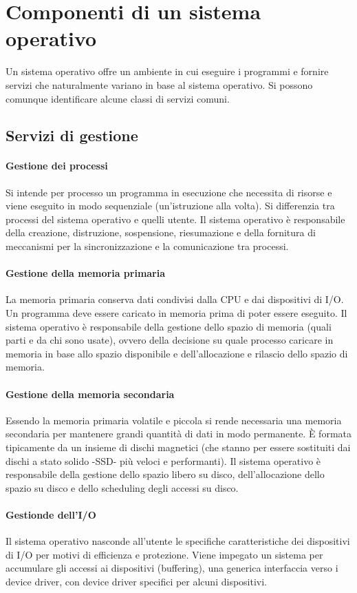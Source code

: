 \chapter{Componenti di un sistema operativo}
Un sistema operativo offre un ambiente in cui eseguire i programmi e fornire servizi che naturalmente variano in base al sistema operativo. Si possono comunque identificare alcune classi di servizi comuni.
\section{Servizi di gestione}
\subsubsection{Gestione dei processi}
Si intende per processo un programma in esecuzione che necessita di risorse e viene eseguito in modo sequenziale (un'istruzione alla volta). Si differenzia tra processi del sistema operativo e quelli utente. Il 
sistema operativo \`e responsabile della creazione, distruzione, sospensione, riesumazione e della fornitura di meccanismi per la sincronizzazione e la comunicazione tra processi.
\subsubsection{Gestione della memoria primaria}
La memoria primaria conserva dati condivisi dalla CPU e dai dispositivi di I/O. Un programma deve essere caricato in memoria prima di poter essere eseguito. Il sistema operativo \`e responsabile della gestione 
dello spazio di memoria (quali parti e da chi sono usate), ovvero della decisione su quale processo caricare in memoria in base allo spazio disponibile e dell'allocazione e rilascio dello spazio di memoria. 
\subsubsection{Gestione della memoria secondaria}
Essendo la memoria primaria volatile e piccola si rende necessaria una memoria secondaria per mantenere grandi quantit\`a di dati in modo permanente. \`E formata tipicamente da un insieme di dischi 
magnetici (che stanno per essere sostituiti dai dischi a stato solido -SSD- pi\`u veloci e performanti). Il sistema operativo \`e responsabile della gestione dello spazio libero su disco, dell'allocazione dello spazio su disco e 
dello scheduling degli accessi su disco. 
\subsubsection{Gestionde dell'I/O}
Il sistema operativo nasconde all'utente le specifiche caratteristiche dei dispositivi di I/O per motivi di efficienza e protezione. Viene impegato un sistema per accumulare gli accessi ai dispositivi (buffering), una generica 
interfaccia verso i device driver, con device driver specifici per alcuni dispositivi. 
